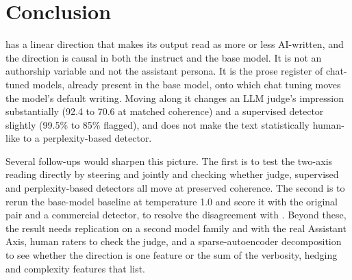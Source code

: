 \section{Conclusion}
\label{sec:conclusion}

\llamai has a linear direction that makes its output read as more or less AI-written, and the direction is causal in both the instruct and the base model.
It is not an authorship variable and not the assistant persona.
It is the prose register of chat-tuned models, already present in the base model, onto which chat tuning moves the model's default writing.
Moving along it changes an LLM judge's impression substantially (92.4 to 70.6 at matched coherence) and a supervised detector slightly (99.5\% to 85\% flagged), and does not make the text statistically human-like to a perplexity-based detector.

Several follow-ups would sharpen this picture.
The first is to test the two-axis reading directly by steering \airead and \aibase jointly and checking whether judge, supervised and perplexity-based detectors all move at preserved coherence.
The second is to rerun the base-model baseline at temperature 1.0 and score it with the original \bino pair and a commercial detector, to resolve the disagreement with \citet{xu2026base}.
Beyond these, the result needs replication on a second model family and with the real Assistant Axis, human raters to check the judge, and a sparse-autoencoder decomposition to see whether the direction is one feature or the sum of the verbosity, hedging and complexity features that \citet{kuznetsov2025sae} list.
